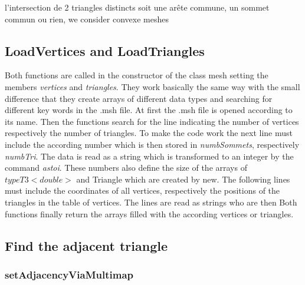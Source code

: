 \documentclass[10pt]{article}
\begin{document}
l’intersection de 2 triangles distincts soit une arête commune, un sommet commun ou rien, we consider convexe meshes


\subsection{LoadVertices and LoadTriangles} \label{Load}
Both functions are called in the constructor of the class mesh setting the members {\itshape vertices} and {\itshape triangles}. 
They work basically the same way with the small difference that they create arrays of different data types and searching for different key words in the .msh file. 
At first the .msh file is opened according to its name. Then the functions search for the line indicating the number of vertices respectively the number of triangles. 
To make the code work the next line must include the according number which is then stored in {\itshape numbSommets}, respectively {\itshape numbTri}. The data is read as a string which is transformed to an integer by the command {\itshape astoi}. These numbers also define the size of the arrays of $  type T3<double> $ and Triangle which are created by new. The following lines must include the coordinates of all vertices, respectively the positions of the triangles in the table of vertices. The lines are read as strings who are then 
Both functions finally return the arrays filled with the according vertices or triangles.


\subsection{Find the adjacent triangle}

\subsubsection{setAdjacencyViaMultimap} \label{multimap}
\end{document}
